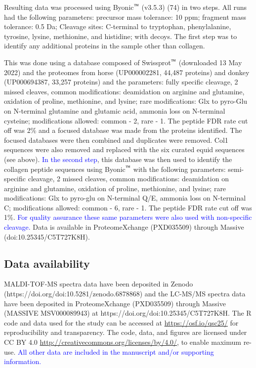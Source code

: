\documentclass[preprint, 3p, authoryear]{elsarticle} %
\begin{document}
Resulting data was processed using Byonic\(^\text{\texttrademark}\) (v3.5.3) (74) in two steps. All runs had the following parameters: precursor mass tolerance: 10 ppm; fragment mass tolerance: 0.5 Da; Cleavage sites: C-terminal to tryptophan, phenylalanine, tyrosine, lysine, methionine, and histidine; with decoys. The first step was to identify any additional proteins in the sample other than collagen.

This was done using a database composed of Swissprot\(^\text{\texttrademark}\) (downloaded 13 May 2022) and the proteomes from horse (UP000002281, 44,487 proteins) and donkey (UP000694387, 33,257 proteins) and the parameters: fully specific cleavage, 2 missed cleaves, common modifications: deamidation on arginine and glutamine, oxidation of proline, methionine, and lysine; rare modifications: Glx to pyro-Glu on N-terminal glutamine and glutamic acid, ammonia loss on N-terminal cysteine; modifications allowed: common - 2, rare - 1. The peptide FDR rate cut off was 2\% and a focused database was made from the proteins identified. The focused databases were then combined and duplicates were removed. Col1 sequences were also removed and replaced with the six curated equid sequences (see above). \textcolor{blue}{In the second step}, this database was then used to identify the collagen peptide sequences using Byonic\(^\text{\texttrademark}\) with the following parameters: semi-specific cleavage, 2 missed cleaves, common modifications: deamidation on arginine and glutamine, oxidation of proline, methionine, and lysine; rare modifications: Glx to pyro-glu on N-terminal Q/E, ammonia loss on N-terminal C; modifications allowed: common - 6, rare - 1. The peptide FDR rate cut off was 1\%. \textcolor{blue}{For quality assurance these same parameters were also used with non-specific cleavage.} Data is available in ProteomeXchange (PXD035509) through Massive (doi:10.25345/C5T727K8H).

\hypertarget{data-availability}{%
\subsection{Data availability}\label{data-availability}}

MALDI-TOF-MS spectra data have been deposited in Zenodo (https://doi.org/doi:10.5281/zenodo.6878868) and the LC-MS/MS spectra data have been deposited in ProteomeXchange (PXD035509) through Massive (MASSIVE MSV000089943) at https://doi.org/doi:10.25345/C5T727K8H. The R code and data used for the study can be accessed at \url{https://osf.io/qsc25/} for reproducibility and transparency. The code, data, and figures are licensed under CC BY 4.0 \url{http://creativecommons.org/licenses/by/4.0/}, to enable maximum re-use. \textcolor{blue}{All other data are included in the manuscript and/or supporting information.}
\end{document}
